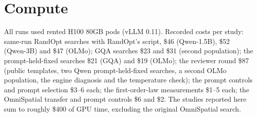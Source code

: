 \documentclass{article}
\begin{document}
\section{Compute}\label{app:compute}
All runs used rented H100 80GB pods (vLLM 0.11). Recorded costs per study: same-run RandOpt searches with RandOpt's
script, \$46 (Qwen-1.5B), \$52 (Qwen-3B) and \$47 (OLMo); GQA searches \$23 and \$31 (second population); the
prompt-held-fixed searches \$21 (GQA) and \$19 (OLMo); the reviewer round \$87 (public templates, two Qwen
prompt-held-fixed searches, a second OLMo population, the engine diagnosis and the temperature check); the prompt
controls and prompt selection \$3--6 each; the first-order-law measurements \$1--5 each; the OmniSpatial transfer and
prompt controls \$6 and \$2. The studies reported here sum to roughly \$400 of GPU time, excluding the original
OmniSpatial search.
\end{document}
